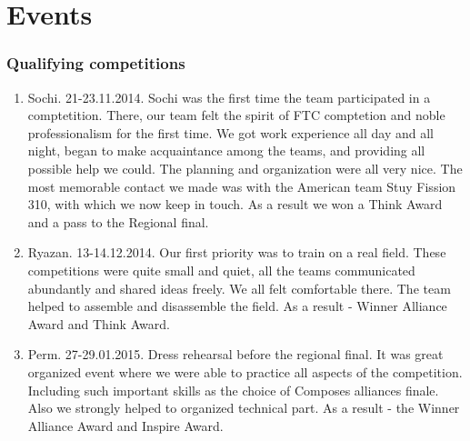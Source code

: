 \section{Events}
	\subsubsection{Qualifying competitions}
		\begin{enumerate}
			\item Sochi. 21-23.11.2014. 
			Sochi was the first time the team participated in a comptetition. There, our team felt the spirit of FTC comptetion and noble professionalism for the first time. We got work experience all day and all night, began to make acquaintance among the teams, and providing all possible help we could. The planning and organization were all very nice. The most memorable contact we made was with the American team Stuy Fission 310, with which we now keep in touch. As a result we won a Think Award and a pass to the Regional final.
			\begin{figure}[H]
			\end{figure}
			\item Ryazan. 13-14.12.2014. 
			Our first priority was to train on a real field. These competitions were quite small and quiet, all the teams communicated abundantly and shared ideas freely. We all felt comfortable there. The team helped to assemble and disassemble the field. As a result - Winner Alliance Award and Think Award. 
			\begin{figure}[H]
	     	\end{figure}	
			\item Perm. 27-29.01.2015. 
			Dress rehearsal before the regional final. It was great organized event where we were able to practice all aspects of the competition. Including such important skills as the choice of Composes alliances finale. Also we strongly helped to organized technical part. As a result - the Winner Alliance Award and Inspire Award.
			\begin{figure}[H]
				\\
	     	\end{figure}
		\end{enumerate}  
